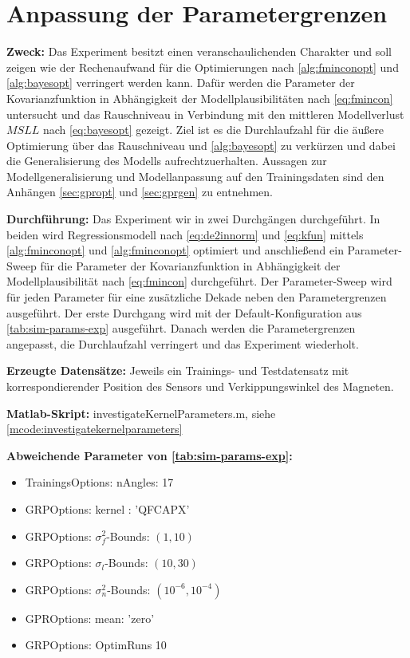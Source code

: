 %

\section{Anpassung der Parametergrenzen}\label{sec:exp4}

\textbf{Zweck:} Das Experiment besitzt einen veranschaulichenden Charakter und soll zeigen wie der Rechenaufwand für die Optimierungen nach \autoref{alg:fminconopt} und \autoref{alg:bayesopt} verringert werden kann. Dafür werden die Parameter der Kovarianzfunktion in Abhängigkeit der Modellplausibilitäten nach \autoref{eq:fmincon} untersucht und das Rauschniveau in Verbindung mit den mittleren Modellverlust $MSLL$ nach \autoref{eq:bayesopt} gezeigt. Ziel ist es die Durchlaufzahl für die äußere Optimierung über das Rauschniveau und \autoref{alg:bayesopt} zu verkürzen und dabei die Generalisierung des Modells aufrechtzuerhalten.
Aussagen zur Modellgeneralisierung und Modellanpassung auf den Trainingsdaten sind den Anhängen \autoref{sec:gpropt} und \autoref{sec:gprgen} zu entnehmen.

\textbf{Durchführung:} Das Experiment wir in zwei Durchgängen durchgeführt. In beiden wird Regressionsmodell nach \autoref{eq:de2innorm} und \autoref{eq:kfun} mittels \autoref{alg:fminconopt} und \autoref{alg:fminconopt} optimiert und anschließend ein Parameter-Sweep für die Parameter der Kovarianzfunktion in Abhängigkeit der Modellplausibilität nach \autoref{eq:fmincon} durchgeführt. Der Parameter-Sweep wird für jeden Parameter für eine zusätzliche Dekade neben den Parametergrenzen ausgeführt. Der erste Durchgang wird mit der Default-Konfiguration aus \autoref{tab:sim-params-exp} ausgeführt. Danach werden die Parametergrenzen angepasst, die Durchlaufzahl verringert und das Experiment wiederholt.

\textbf{Erzeugte Datensätze:} Jeweils ein Trainings- und Testdatensatz mit korrespondierender Position des Sensors und Verkippungswinkel des Magneten.

\textbf{Matlab-Skript:} investigateKernelParameters.m, siehe \autoref{mcode:investigatekernelparameters}

\textbf{Abweichende Parameter von \autoref{tab:sim-params-exp}:}

\begin{itemize}
	\item TrainingsOptions: nAngles: 17
	\item GRPOptions: kernel : 'QFCAPX'
	\item GRPOptions: $\sigma_f^2$-Bounds: $(1,10)$
	\item GRPOptions: $\sigma_l$-Bounds: $(10,30)$
	\item GRPOptions: $\sigma_n^2$-Bounds: $(10^{-6},10^{-4})$
	\item GPROptions: mean: 'zero'
	\item GRPOptions: OptimRuns 10
\end{itemize}


